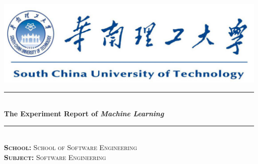 \documentclass[journal, a4paper]{IEEEtran}
\begin{document}
\begin{titlepage}

\newcommand{\HRule}{\rule{\linewidth}{0.5mm}} %

\center %

~\\[1cm]
\includegraphics{SCUT.png}\\[2cm] %


\HRule \\[1cm]
{ \huge \bfseries The Experiment Report of \textit{Machine Learning} }\\[0.6cm] %
\HRule \\[2cm]


\textsc{\LARGE \textbf{School:} School of Software Engineering}\\[1cm]
\textsc{\LARGE \textbf{Subject:} Software Engineering}\\[2cm]




\end{titlepage}
\end{document}
